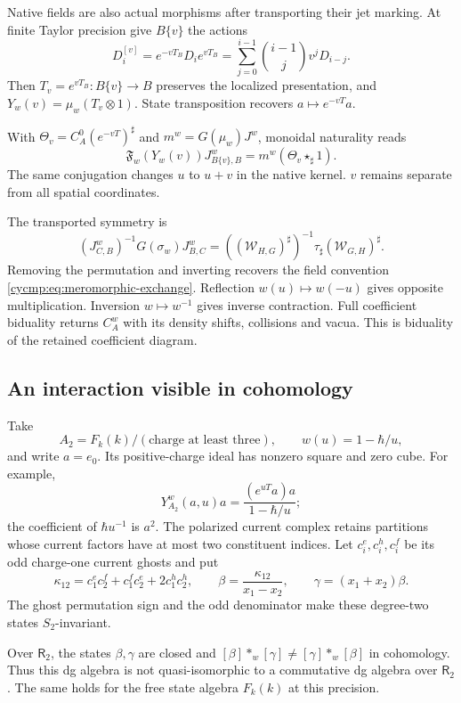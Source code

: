 Native fields are also actual morphisms after transporting their jet
marking. At finite Taylor precision give $B\{v\}$ the actions
\[
 D_i^{[v]}=e^{-vT_B}D_ie^{vT_B}
       =\sum_{j=0}^{i-1}\binom{i-1}{j}v^jD_{i-j}.
\]
Then $T_v=e^{vT_B}:B\{v\}\to B$ preserves the localized
presentation, and $Y_w(v)=\mu_w(T_v\otimes1)$.
State transposition recovers $a\mapsto e^{-vT}a$.

With $\Theta_v=C_A^0(e^{-vT})^\sharp$ and $m^w=G(\mu_w)J^w$,
monoidal naturality reads
\[
 \mathfrak F_w(Y_w(v))J^w_{B\{v\},B}
       =m^w(\Theta_v\star_\sharp1).
\]
The same conjugation changes $u$ to $u+v$ in the native kernel.
$v$ remains separate from all spatial coordinates.

The transported symmetry is
\[
 (J^w_{C,B})^{-1}G(\sigma_w)J^w_{B,C}
 =((\mathcal W_{H,G})^\sharp)^{-1}\tau_\sharp
                                      (\mathcal W_{G,H})^\sharp.
\]
Removing the permutation and inverting recovers the field convention
\eqref{cycmp:eq:meromorphic-exchange}. Reflection $w(u)\mapsto w(-u)$
gives opposite multiplication. Inversion $w\mapsto w^{-1}$ gives
inverse contraction. Full coefficient biduality returns $C_A^w$
with its density shifts, collisions and vacua. This is biduality
of the retained coefficient diagram.

\subsection{An interaction visible in cohomology}

Take
\[
 A_2=F_k(k)/(\text{charge at least three}),\qquad
 w(u)=1-\hbar/u,
\]
and write $a=e_0$. Its positive-charge ideal has nonzero square
and zero cube. For example,
\[
 Y_{A_2}^w(a,u)a=\frac{(e^{uT}a)a}{1-\hbar/u};
\]
the coefficient of $\hbar u^{-1}$ is $a^2$.
The polarized current complex retains partitions whose current
factors have at most two constituent indices. Let
$c_i^e,c_i^h,c_i^f$ be its odd charge-one current ghosts and put
\[
 \kappa_{12}=c_1^ec_2^f+c_1^fc_2^e+2c_1^hc_2^h,
 \qquad \beta=\frac{\kappa_{12}}{x_1-x_2},\qquad
 \gamma=(x_1+x_2)\beta.
\]
The ghost permutation sign and the odd denominator make these
degree-two states $S_2$-invariant.

\begin{proposition}\label{cycmp:prop:noncommutative-cohomology}
Over $\mathsf R_2$, the states $\beta,\gamma$ are closed and
$[\beta]*_w[\gamma]\ne[\gamma]*_w[\beta]$ in cohomology.
Thus this dg algebra is not quasi-isomorphic to a commutative dg
algebra over $\mathsf R_2$. The same holds for the free state
algebra $F_k(k)$ at this precision.
\end{proposition}

